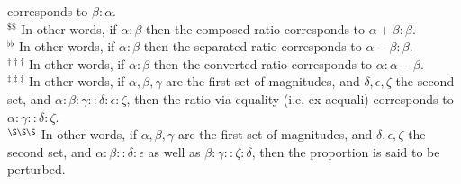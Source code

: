 {corresponds to $\beta:\alpha$.\\[0.5ex]
$^{\$\$}$ In other words, if
 $\alpha:\beta$ then the composed ratio
 corresponds to  $\alpha+\beta:\beta$.\\[0.5ex]
 $^{\flat\flat}$ In other words, if
 $\alpha:\beta$ then the separated ratio
 corresponds to  $\alpha-\beta:\beta$.\\[0.5ex]
 $^{\dag\dag\dag}$ In other words, if
 $\alpha:\beta$ then the converted ratio
 corresponds to  $\alpha:\alpha-\beta$.\\[0.5ex]
 $^{\ddag\ddag\ddag}$ In other words, if $\alpha, \beta, \gamma$ are the first set of
 magnitudes, and $\delta, \epsilon, \zeta$ the second set, and $\alpha:
 \beta:\gamma::\delta:\epsilon:\zeta$,  then
 the ratio via equality (i.e, ex aequali) corresponds to
 $\alpha:\gamma::\delta:\zeta$.\\[0.5ex]
 $^{\S\S\S}$ In other words, if $\alpha, \beta, \gamma$ are the first set of
 magnitudes, and $\delta, \epsilon, \zeta$ the second set, and $\alpha:\beta::\delta:\epsilon$ as well as $\beta:\gamma::\zeta:\delta$, then
 the proportion is said to be perturbed.}

